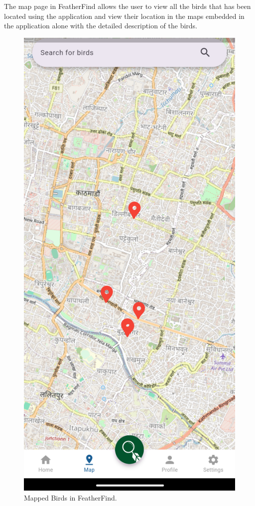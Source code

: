 The map page in FeatherFind allows the user to view all the birds that has been located
using the application and view their location in the maps embedded in the application alone 
with the detailed description of the birds.
\begin{figure}[h!]
    \centering
    \includegraphics[scale=0.26]{images/mappage.png}
    \caption{Mapped Birds in FeatherFind.}
\end{figure}

